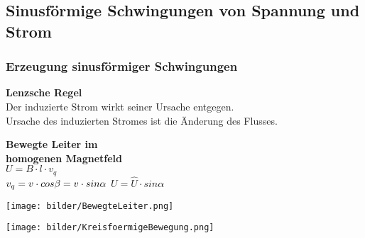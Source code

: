 	\subsection{Sinusf\"ormige Schwingungen von Spannung und Strom}
 		\subsubsection{Erzeugung sinusf\"ormiger Schwingungen}
 			\begin{minipage}{6cm}
 				\textbf{Lenzsche Regel}\\
 					Der induzierte Strom wirkt seiner Ursache entgegen.\\
 					Ursache des induzierten Stromes ist die \"Anderung des Flusses.
             \end{minipage}
             \hfill
 			\begin{minipage}{4.5cm}
 				\textbf{Bewegte Leiter im \\ homogenen Magnetfeld}\\
             	$U = B \cdot l \cdot v_q$ \\
             	             	$v_q = v \cdot cos\beta = v \cdot sin\alpha\\$
             	$U = \hat{U} \cdot sin \alpha$
             \end{minipage}
 			\begin{minipage}{3.5cm}
             	\texttt{[image: bilder/BewegteLeiter.png]}
             \end{minipage}
 			\begin{minipage}{3.5cm}
             	\texttt{[image: bilder/KreisfoermigeBewegung.png]}
             \end{minipage}
